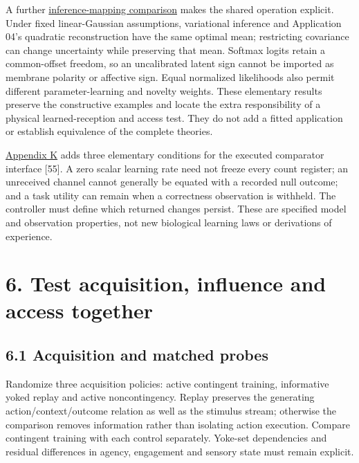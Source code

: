 \documentclass[
  american,
  11pt,
  letterpaper,
]{article}
\begin{document}
A further \href{https://zenodo.org/records/23509961/files/Learning-to-Feel-Technical-Supplement-v1.1.pdf\#appendix-j}{inference-mapping comparison} makes the shared operation explicit. Under fixed linear-Gaussian assumptions, variational inference and Application 04's quadratic reconstruction have the same optimal mean; restricting covariance can change uncertainty while preserving that mean. Softmax logits retain a common-offset freedom, so an uncalibrated latent sign cannot be imported as membrane polarity or affective sign. Equal normalized likelihoods also permit different parameter-learning and novelty weights. These elementary results preserve the constructive examples and locate the extra responsibility of a physical learned-reception and access test. They do not add a fitted application or establish equivalence of the complete theories.

\href{https://zenodo.org/records/23509961/files/Learning-to-Feel-Technical-Supplement-v1.1.pdf\#appendix-k}{Appendix K} adds three elementary conditions for the executed comparator interface {[}55{]}. A zero scalar learning rate need not freeze every count register; an unreceived channel cannot generally be equated with a recorded null outcome; and a task utility can remain when a correctness observation is withheld. The controller must define which returned changes persist. These are specified model and observation properties, not new biological learning laws or derivations of experience.

\section{6. Test acquisition, influence and access together}\label{test-acquisition-influence-and-access-together}

\subsection{6.1 Acquisition and matched probes}\label{acquisition-and-matched-probes}

Randomize three acquisition policies: active contingent training, informative yoked replay and active noncontingency. Replay preserves the generating action/context/outcome relation as well as the stimulus stream; otherwise the comparison removes information rather than isolating action execution. Compare contingent training with each control separately. Yoke-set dependencies and residual differences in agency, engagement and sensory state must remain explicit.
\end{document}
